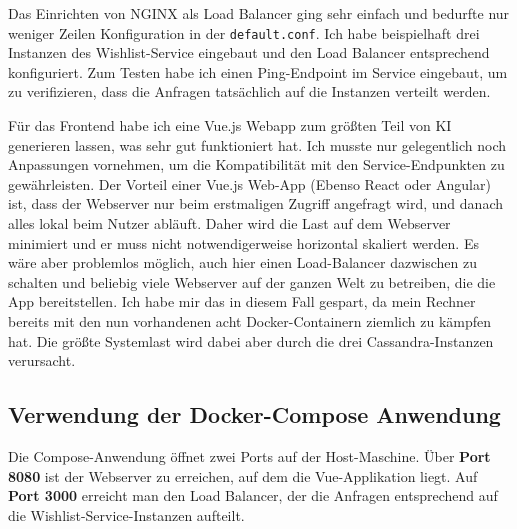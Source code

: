 \documentclass[12pt]{article}
\begin{document}
Das Einrichten von NGINX als Load Balancer ging sehr einfach und bedurfte nur weniger Zeilen Konfiguration in der \texttt{default.conf}.
Ich habe beispielhaft drei Instanzen des Wishlist-Service eingebaut und den Load Balancer entsprechend konfiguriert.
Zum Testen habe ich einen Ping-Endpoint im Service eingebaut, um zu verifizieren, dass die Anfragen tatsächlich auf die Instanzen verteilt werden.

Für das Frontend habe ich eine Vue.js Webapp zum größten Teil von KI generieren lassen, was sehr gut funktioniert hat.
Ich musste nur gelegentlich noch Anpassungen vornehmen, um die Kompatibilität mit den Service-Endpunkten zu gewährleisten.
Der Vorteil einer Vue.js Web-App (Ebenso React oder Angular) ist, dass der Webserver nur beim erstmaligen Zugriff angefragt wird, und danach alles lokal beim Nutzer abläuft.
Daher wird die Last auf dem Webserver minimiert und er muss nicht notwendigerweise horizontal skaliert werden.
Es wäre aber problemlos möglich, auch hier einen Load-Balancer dazwischen zu schalten und beliebig viele Webserver auf der ganzen Welt zu betreiben, die die App bereitstellen.
Ich habe mir das in diesem Fall gespart, da mein Rechner bereits mit den nun vorhandenen acht Docker-Containern ziemlich zu kämpfen hat.
Die größte Systemlast wird dabei aber durch die drei Cassandra-Instanzen verursacht.

\subsection*{Verwendung der Docker-Compose Anwendung}
Die Compose-Anwendung öffnet zwei Ports auf der Host-Maschine.
Über \textbf{Port 8080} ist der Webserver zu erreichen, auf dem die Vue-Applikation liegt.
Auf \textbf{Port 3000} erreicht man den Load Balancer, der die Anfragen entsprechend auf die Wishlist-Service-Instanzen aufteilt.
\end{document}
